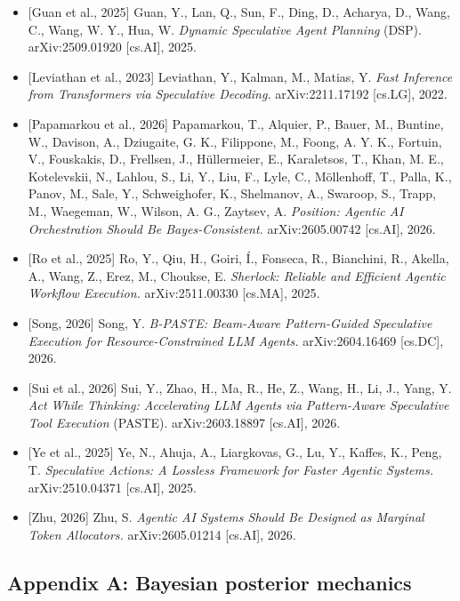 \documentclass[
  11pt,
]{article}
\providecommand{\tightlist}{%
  \setlength{\itemsep}{0pt}\setlength{\parskip}{0pt}}
\begin{document}
\begin{itemize}
\tightlist
\item
  {[}Guan et al., 2025{]} Guan, Y., Lan, Q., Sun, F., Ding, D., Acharya,
  D., Wang, C., Wang, W. Y., Hua, W. \emph{Dynamic Speculative Agent
  Planning} (DSP). arXiv:2509.01920 {[}cs.AI{]}, 2025.
\item
  {[}Leviathan et al., 2023{]} Leviathan, Y., Kalman, M., Matias, Y.
  \emph{Fast Inference from Transformers via Speculative Decoding.}
  arXiv:2211.17192 {[}cs.LG{]}, 2022.
\item
  {[}Papamarkou et al., 2026{]} Papamarkou, T., Alquier, P., Bauer, M.,
  Buntine, W., Davison, A., Dziugaite, G. K., Filippone, M., Foong, A.
  Y. K., Fortuin, V., Fouskakis, D., Frellsen, J., Hüllermeier, E.,
  Karaletsos, T., Khan, M. E., Kotelevskii, N., Lahlou, S., Li, Y., Liu,
  F., Lyle, C., Möllenhoff, T., Palla, K., Panov, M., Sale, Y.,
  Schweighofer, K., Shelmanov, A., Swaroop, S., Trapp, M., Waegeman, W.,
  Wilson, A. G., Zaytsev, A. \emph{Position: Agentic AI Orchestration
  Should Be Bayes-Consistent.} arXiv:2605.00742 {[}cs.AI{]}, 2026.
\item
  {[}Ro et al., 2025{]} Ro, Y., Qiu, H., Goiri, Í., Fonseca, R.,
  Bianchini, R., Akella, A., Wang, Z., Erez, M., Choukse, E.
  \emph{Sherlock: Reliable and Efficient Agentic Workflow Execution.}
  arXiv:2511.00330 {[}cs.MA{]}, 2025.
\item
  {[}Song, 2026{]} Song, Y. \emph{B-PASTE: Beam-Aware Pattern-Guided
  Speculative Execution for Resource-Constrained LLM Agents.}
  arXiv:2604.16469 {[}cs.DC{]}, 2026.
\item
  {[}Sui et al., 2026{]} Sui, Y., Zhao, H., Ma, R., He, Z., Wang, H.,
  Li, J., Yang, Y. \emph{Act While Thinking: Accelerating LLM Agents via
  Pattern-Aware Speculative Tool Execution} (PASTE). arXiv:2603.18897
  {[}cs.AI{]}, 2026.
\item
  {[}Ye et al., 2025{]} Ye, N., Ahuja, A., Liargkovas, G., Lu, Y.,
  Kaffes, K., Peng, T. \emph{Speculative Actions: A Lossless Framework
  for Faster Agentic Systems.} arXiv:2510.04371 {[}cs.AI{]}, 2025.
\item
  {[}Zhu, 2026{]} Zhu, S. \emph{Agentic AI Systems Should Be Designed as
  Marginal Token Allocators.} arXiv:2605.01214 {[}cs.AI{]}, 2026.
\end{itemize}

\subsection{Appendix A: Bayesian posterior
mechanics}\label{appendix-a-bayesian-posterior-mechanics}
\end{document}

